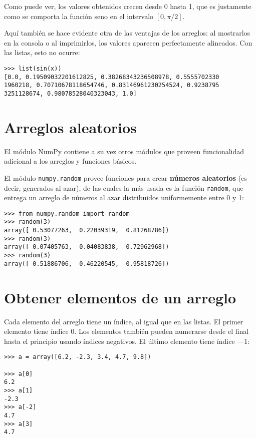 Como puede ver, los valores obtenidos crecen desde 0 hasta 1, que es
justamente como se comporta la función seno en el intervalo
\(\left[0, \pi/2\right]\).

Aquí también se hace evidente otra de las ventajas de los arreglos: al
mostrarlos en la consola o al imprimirlos, los valores aparecen
perfectamente alineados. Con las listas, esto no ocurre:

\begin{lstlisting}
>>> list(sin(x))
[0.0, 0.19509032201612825, 0.38268343236508978, 0.5555702330
1960218, 0.70710678118654746, 0.83146961230254524, 0.9238795
3251128674, 0.98078528040323043, 1.0]
\end{lstlisting}

\section{Arreglos aleatorios}

El módulo NumPy contiene a su vez otros módulos que proveen
funcionalidad adicional a los arreglos y funciones básicos.

El módulo \lstinline!numpy.random! provee funciones para crear
\textbf{números aleatorios} (es decir, generados al azar), de las cuales
la más usada es la función \lstinline!random!, que entrega un arreglo de
números al azar distribuidos uniformemente entre 0 y 1:

\begin{lstlisting}
>>> from numpy.random import random
>>> random(3)
array([ 0.53077263,  0.22039319,  0.81268786])
>>> random(3)
array([ 0.07405763,  0.04083838,  0.72962968])
>>> random(3)
array([ 0.51886706,  0.46220545,  0.95818726])
\end{lstlisting}

\section{Obtener elementos de un arreglo}

Cada elemento del arreglo tiene un índice, al igual que en las listas.
El primer elemento tiene índice 0. Los elementos también pueden
numerarse desde el final hasta el principio usando índices negativos. El
último elemento tiene índice ---1:

\begin{lstlisting}
>>> a = array([6.2, -2.3, 3.4, 4.7, 9.8])

>>> a[0]
6.2
>>> a[1]
-2.3
>>> a[-2]
4.7
>>> a[3]
4.7
\end{lstlisting}

